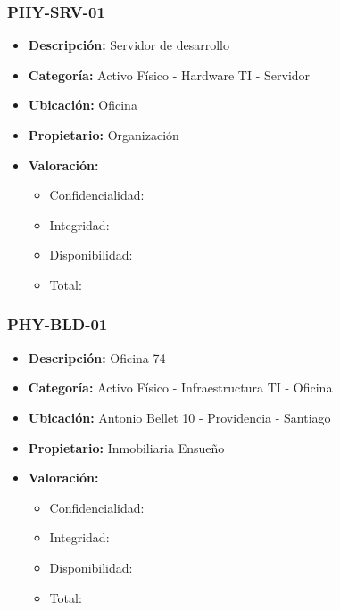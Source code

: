 \documentclass[11pt]{utalcaDoc}
\begin{document}
\subsubsection{PHY-SRV-01}
\begin{itemize}
    \item {\textbf{Descripción:}   Servidor de desarrollo }
    \item {\textbf{Categoría:}     Activo Físico - Hardware TI - Servidor}
    \item {\textbf{Ubicación:}     Oficina }
    \item {\textbf{Propietario:}   Organización } %
    \item {\textbf{Valoración:}
          \begin{itemize}
              \item Confidencialidad:
              \item Integridad:
              \item Disponibilidad:
              \item Total:
          \end{itemize}
          }
\end{itemize}

\subsubsection{PHY-BLD-01}
\begin{itemize}
    \item {\textbf{Descripción:}   Oficina 74 }
    \item {\textbf{Categoría:}     Activo Físico - Infraestructura TI - Oficina}
    \item {\textbf{Ubicación:}     Antonio Bellet 10 - Providencia - Santiago }
    \item {\textbf{Propietario:}   Inmobiliaria Ensueño } %
    \item {\textbf{Valoración:}
          \begin{itemize}
              \item Confidencialidad:
              \item Integridad:
              \item Disponibilidad:
              \item Total:
          \end{itemize}
          }
\end{itemize}
\end{document}
